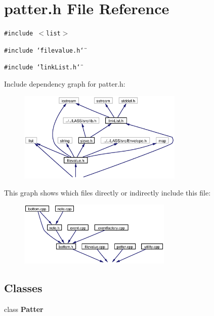 \section{patter.h File Reference}
\label{patter_8h}
{\tt \#include $<$list$>$}\par
{\tt \#include \char`\"{}filevalue.h\char`\"{}}\par
{\tt \#include \char`\"{}link\-List.h\char`\"{}}\par


Include dependency graph for patter.h:\begin{figure}[H]
\begin{center}
\leavevmode
\includegraphics[width=223pt]{patter_8h__incl}
\end{center}
\end{figure}


This graph shows which files directly or indirectly include this file:\begin{figure}[H]
\begin{center}
\leavevmode
\includegraphics[width=207pt]{patter_8h__dep__incl}
\end{center}
\end{figure}
\subsection*{Classes}
\begin{CompactItemize}
\item 
class {\bf Patter}
\end{CompactItemize}
